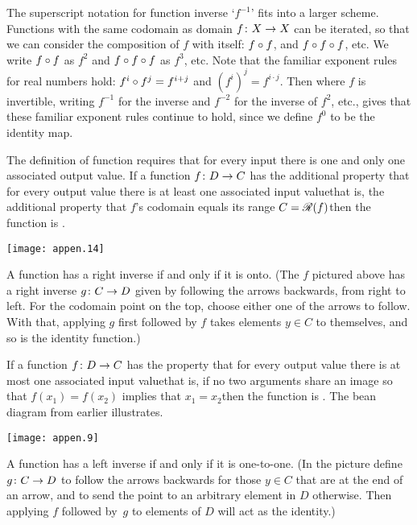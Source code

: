 The superscript notation for function inverse `\( f^{-1} \)' 
fits into a larger scheme.
Functions with the same codomain as domain $\mbox{$f\colon X\to X$}$ can be iterated,
so that we can consider
the composition of $f$ with itself: \( f\mathbin{\circ} f \), 
and \( f\mathbin{\circ} f\mathbin{\circ} f \), etc.
We 
write $f\mathbin{\circ} f$ as \( f^2 \) and 
$f\mathbin{\circ} f\mathbin{\circ} f$ as \( f^3 \), etc.
Note that the familiar exponent rules for real numbers hold:
\( f^i\mathbin{\circ} f^j=f^{i+j} \) and \( (f^i)^j=f^{i\cdot j} \).
Then where \( f \) is invertible,
writing \( f^{-1} \) for the inverse
and \( f^{-2} \) for the inverse of \( f^2 \), etc., gives that
these familiar exponent rules continue to hold, since we define
\( f^0 \) to be the identity map.

The definition of function requires that for every 
input there is one and only one associated output value.
If a function $\mbox{$f\colon D\to C$}$ has the additional property that for every
output value there is at least one associated input value\Dash that is, 
the additional property that
$f$'s codomain equals its range \( C=\mathscr{R}(f) \)\Dash then 
the function is
.
\begin{center}
  \texttt{[image: appen.14]}
\end{center}
A function has a right inverse if and only if it is onto. 
(The $f$ pictured above has a right inverse $\mbox{$g\colon C\to D$}$ given by
following the arrows backwards, from right to left.
For the codomain point on the top, choose either one of the arrows to follow.
With that, applying $g$ first followed by $f$ takes elements
$y\in C$ to themselves, and so is the identity function.)

If a 
function $\mbox{$f\colon D\to C$}$ has the property that for every
output value there is at most one associated input value\Dash that is, 
if no two arguments share an image so that
\( f(x_1)=f(x_2) \) implies  that \( x_1 = x_2 \)\Dash then 
the function is
.
The bean diagram from earlier illustrates.
\begin{center}
  \texttt{[image: appen.9]}
\end{center}
A function has a left inverse if and only if it is one-to-one.
(In the picture define $\mbox{$g\colon C\to D$}$ to follow the arrows backwards for
those $y\in C$ that are at the end of an arrow, and to send the point
to an arbitrary element in $D$ otherwise.
Then applying $f$ followed by~$g$ to elements of $D$ will act as the 
identity.)

